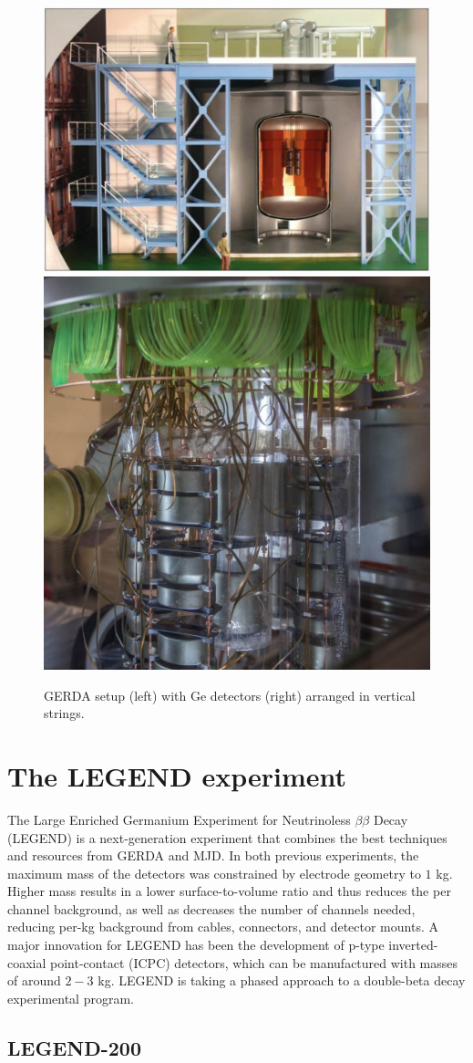 \begin{figure}
\centering
\includegraphics[height=0.38\columnwidth]{ch2/figs/gerda_setup.pdf}
\qquad
\includegraphics[height=0.38\columnwidth]{ch2/figs/gerdastrings.pdf}
\caption{GERDA setup (left) with Ge detectors (right) arranged in vertical strings.}
\label{fig:gerda}
\end{figure}
  
\section{The LEGEND experiment}
The Large Enriched Germanium Experiment for Neutrinoless $\beta\beta$ Decay (LEGEND) is a next-generation experiment that combines the best techniques and resources from GERDA and MJD. In both previous experiments, the maximum mass of the detectors was constrained by electrode geometry to $1$ kg. Higher mass results in a lower surface-to-volume ratio and thus reduces the per channel background, as well as decreases the number of channels needed, reducing per-kg background from cables, connectors, and detector mounts. A major innovation for LEGEND has been the development of p-type inverted-coaxial point-contact (ICPC) detectors, which can be manufactured with masses of around $2-3$ kg. LEGEND is taking a phased approach to a double-beta decay experimental program.

\subsection{LEGEND-200}

